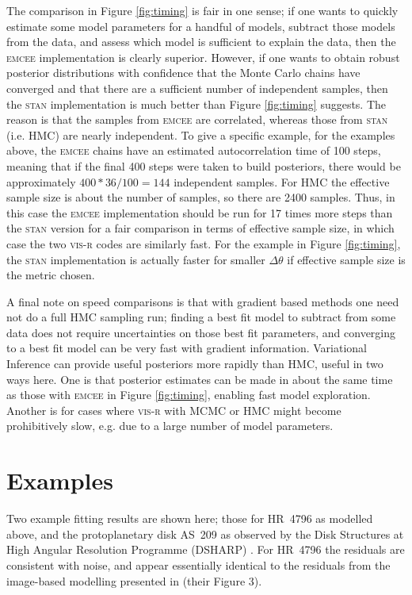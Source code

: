 \documentclass[fleqn,usenatbib]{mnras}
\begin{document}
The comparison in Figure \ref{fig:timing} is fair in one sense; if one wants to quickly estimate some model parameters for a handful of models, subtract those models from the data, and assess which model is sufficient to explain the data, then the \textsc{emcee} implementation is clearly superior. However, if one wants to obtain robust posterior distributions with confidence that the Monte Carlo chains have converged and that there are a sufficient number of independent samples, then the \textsc{stan} implementation is much better than Figure \ref{fig:timing} suggests. The reason is that the samples from \textsc{emcee} are correlated, whereas those from \textsc{stan} (i.e. HMC) are nearly independent. To give a specific example, for the examples above, the \textsc{emcee} chains have an estimated autocorrelation time of 100 steps, meaning that if the final 400 steps were taken to build posteriors, there would be approximately $400*36/100=144$ independent samples. For HMC the effective sample size is about the number of samples, so there are 2400 samples. Thus, in this case the \textsc{emcee} implementation should be run for 17 times more steps than the \textsc{stan} version for a fair comparison in terms of effective sample size, in which case the two \textsc{vis-r} codes are similarly fast. For the example in Figure \ref{fig:timing}, the \textsc{stan} implementation is actually faster for smaller $\Delta \theta$ if effective sample size is the metric chosen.

A final note on speed comparisons is that with gradient based methods one need not do a full HMC sampling run; finding a best fit model to subtract from some data does not require uncertainties on those best fit parameters, and converging to a best fit model can be very fast with gradient information. Variational Inference can provide useful posteriors more rapidly than HMC, useful in two ways here. One is that posterior estimates can be made in about the same time as those with \textsc{emcee} in Figure \ref{fig:timing}, enabling fast model exploration. Another is for cases where \textsc{vis-r} with MCMC or HMC might become prohibitively slow, e.g. due to a large number of model parameters.

\section{Examples}

Two example fitting results are shown here; those for HR~4796 as modelled above, and the protoplanetary disk AS~209 as observed by the Disk Structures at High Angular Resolution Programme (DSHARP) \citep{2018ApJ...869L..48G}. For HR~4796 the residuals are consistent with noise, and appear essentially identical to the residuals from the image-based modelling presented in \citet{2018MNRAS.475.4924K} (their Figure 3).
\end{document}
